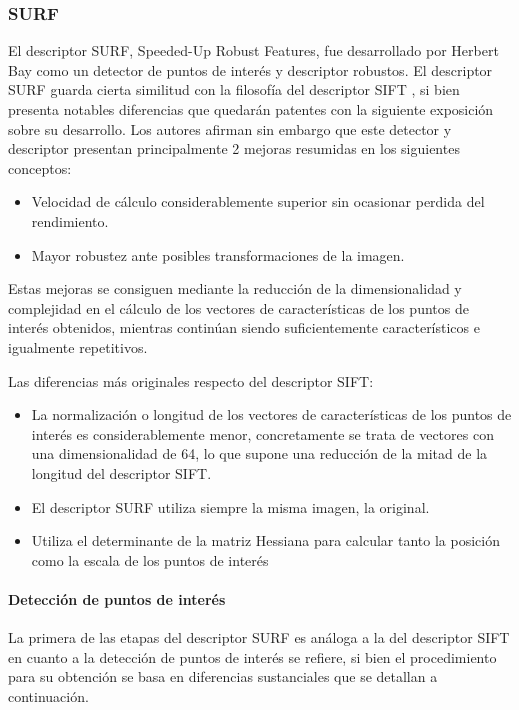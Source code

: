 \subsubsection{SURF}
El descriptor SURF, Speeded-Up Robust Features, fue desarrollado por Herbert Bay \cite{Bay} como un detector de puntos de interés y descriptor robustos. El descriptor SURF guarda cierta similitud con la filosofía del descriptor SIFT \cite{Lowe}, si bien presenta notables diferencias que quedarán patentes con la siguiente exposición sobre su desarrollo. Los autores afirman sin embargo que este detector y descriptor presentan principalmente 2 mejoras resumidas en los siguientes conceptos: 
\begin{itemize}
\item Velocidad de cálculo considerablemente superior sin ocasionar perdida del rendimiento.
\item Mayor robustez ante posibles transformaciones de la imagen. 
\end{itemize}
Estas mejoras se consiguen mediante la reducción de la dimensionalidad y complejidad en el cálculo de los vectores de características de los puntos de interés obtenidos, mientras continúan siendo suficientemente característicos e igualmente repetitivos. 

Las diferencias más originales respecto del descriptor SIFT:
\begin{itemize}
\item La normalización o longitud de los vectores de características de los puntos de interés es considerablemente menor, concretamente se trata de vectores con una dimensionalidad de 64, lo que supone una reducción de la mitad de la longitud del descriptor SIFT.
\item El descriptor SURF utiliza siempre la misma imagen, la original. 
\item Utiliza el determinante de la matriz Hessiana para calcular tanto la posición como la escala de los puntos de interés
\end{itemize}

\paragraph{Detección de puntos de interés} 
La primera de las etapas del descriptor SURF es análoga a la del descriptor SIFT en cuanto a la detección de puntos de interés se refiere, si bien el procedimiento para su obtención se basa en diferencias sustanciales que se detallan a continuación. 

